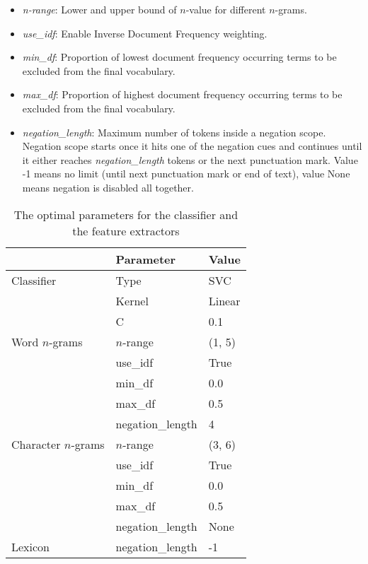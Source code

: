 \begin{itemize}
    \item \textit{n-range}: Lower and upper bound of $n$-value for different $n$-grams.
    \item \textit{use\_idf}: Enable Inverse Document Frequency weighting. 
    \item \textit{min\_df}: Proportion of lowest document frequency occurring terms to be excluded from the final vocabulary.
    \item \textit{max\_df}: Proportion of highest document frequency occurring terms to be excluded from the final vocabulary.
    \item \textit{negation\_length}: Maximum number of tokens inside a negation scope. Negation scope starts once it hits one of the negation cues and continues until it either reaches \textit{negation\_length} tokens or the next punctuation mark. Value -1 means no limit (until next punctuation mark or end of text), value None means negation is disabled all together.
\end{itemize}


\begin{table}[t]
    \centering
    \begin{tabular}{|l|l|p{5cm}|}
        \hline
                        & \textbf{Parameter} & \textbf{Value} \\ \hline
        Classifier      & Type              & SVC \\ \cline{2-3}
                        & Kernel            & Linear \\ \cline{2-3}
                        & C                 & 0.1 \\ \hline
        
        Word $n$-grams  & $n$-range         & (1, 5) \\ \cline{2-3}
                        & use\_idf          & True \\ \cline{2-3}
                        & min\_df           & 0.0 \\ \cline{2-3}
                        & max\_df           & 0.5 \\ \cline{2-3}
                        & negation\_length  & 4 \\ \hline
                        
        Character $n$-grams & $n$-range     & (3, 6) \\ \cline{2-3}
                        & use\_idf          & True \\ \cline{2-3}
                        & min\_df           & 0.0 \\ \cline{2-3}
                        & max\_df           & 0.5 \\ \cline{2-3}
                        & negation\_length  & None \\ \hline
                        
        Lexicon         & negation\_length  & -1 \\ \hline
    \end{tabular}
    \caption{The optimal parameters for the classifier and the feature extractors}
    \label{tab:grid_search_results}   
\end{table}


